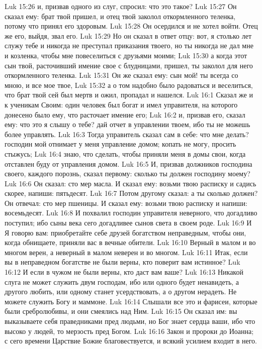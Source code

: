 Luk 15:26  и, призвав одного из слуг, спросил: что это такое?
Luk 15:27  Он сказал ему: брат твой пришел, и отец твой заколол откормленного теленка, потому что принял его здоровым.
Luk 15:28  Он осердился и не хотел войти. Отец же его, выйдя, звал его.
Luk 15:29  Но он сказал в ответ отцу: вот, я столько лет служу тебе и никогда не преступал приказания твоего, но ты никогда не дал мне и козленка, чтобы мне повеселиться с друзьями моими;
Luk 15:30  а когда этот сын твой, расточивший имение свое с блудницами, пришел, ты заколол для него откормленного теленка.
Luk 15:31  Он же сказал ему: сын мой! ты всегда со мною, и все мое твое,
Luk 15:32  а о том надобно было радоваться и веселиться, что брат твой сей был мертв и ожил, пропадал и нашелся.
Luk 16:1  Сказал же и к ученикам Своим: один человек был богат и имел управителя, на которого донесено было ему, что расточает имение его;
Luk 16:2  и, призвав его, сказал ему: что это я слышу о тебе? дай отчет в управлении твоем, ибо ты не можешь более управлять.
Luk 16:3  Тогда управитель сказал сам в себе: что мне делать? господин мой отнимает у меня управление домом; копать не могу, просить стыжусь;
Luk 16:4  знаю, что сделать, чтобы приняли меня в домы свои, когда отставлен буду от управления домом.
Luk 16:5  И, призвав должников господина своего, каждого порознь, сказал первому: сколько ты должен господину моему?
Luk 16:6  Он сказал: сто мер масла. И сказал ему: возьми твою расписку и садись скорее, напиши: пятьдесят.
Luk 16:7  Потом другому сказал: а ты сколько должен? Он отвечал: сто мер пшеницы. И сказал ему: возьми твою расписку и напиши: восемьдесят.
Luk 16:8  И похвалил господин управителя неверного, что догадливо поступил; ибо сыны века сего догадливее сынов света в своем роде.
Luk 16:9  И Я говорю вам: приобретайте себе друзей богатством неправедным, чтобы они, когда обнищаете, приняли вас в вечные обители.
Luk 16:10  Верный в малом и во многом верен, а неверный в малом неверен и во многом.
Luk 16:11  Итак, если вы в неправедном богатстве не были верны, кто поверит вам истинное?
Luk 16:12  И если в чужом не были верны, кто даст вам ваше?
Luk 16:13  Никакой слуга не может служить двум господам, ибо или одного будет ненавидеть, а другого любить, или одному станет усердствовать, а о другом нерадеть. Не можете служить Богу и маммоне.
Luk 16:14  Слышали все это и фарисеи, которые были сребролюбивы, и они смеялись над Ним.
Luk 16:15  Он сказал им: вы выказываете себя праведниками пред людьми, но Бог знает сердца ваши, ибо что высоко у людей, то мерзость пред Богом.
Luk 16:16  Закон и пророки до Иоанна; с сего времени Царствие Божие благовествуется, и всякий усилием входит в него.
